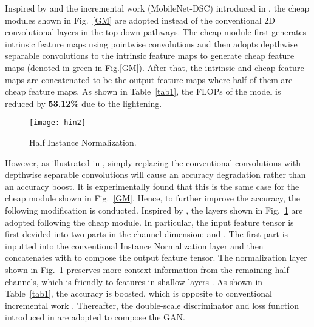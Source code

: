 \documentclass[letterpaper, 10 pt, conference]{ieeeconf}
\begin{document}
Inspired by \cite{ghostnet} and the incremental work (MobileNet-DSC) introduced in \cite{deblurgan2}, the cheap modules shown in Fig.~\ref{GM} are adopted instead of the conventional 2D convolutional layers in the top-down pathways. The cheap module first generates intrinsic feature maps using pointwise convolutions \cite{pw} and then adopts depthwise separable convolutions \cite{dw} to the intrinsic feature maps to generate cheap feature maps (denoted in green in Fig.\ref{GM}).  After that, the intrinsic and cheap feature maps are concatenated to be the output feature maps where half of them are cheap feature maps. As shown in Table~\ref{tab1}, the FLOPs of the model is reduced by \textbf{53.12\%} due to the lightening.
 \begin{figure}[thpb]
	\centering
	\texttt{[image: hin2]}
	\caption{Half Instance Normalization.}
	\label{hin}
\end{figure}

However, as illustrated in \cite{deblurgan2}, simply replacing the conventional convolutions with depthwise separable convolutions will cause an accuracy degradation rather than an accuracy boost. It is experimentally found that this is the same case for the cheap module shown in Fig.~\ref{GM}. Hence, to further improve the accuracy, the following modification is conducted. Inspired by \cite{chen2021hinet}, the layers shown in Fig.~\ref{hin} are adopted following the cheap module.  In particular, the input feature tensor  is first devided into two parts in the channel dimension:  and . The first part  is inputted into the conventional Instance Normalization layer \cite{in} and then concatenates with  to compose the output feature tensor.  The normalization layer shown in Fig.~\ref{hin} preserves more context information from the remaining half channels, which is friendly to features in shallow layers \cite{chen2021hinet}. As shown in Table~\ref{tab1}, the accuracy is boosted, which is opposite to conventional incremental work \cite{truong2020slimdeblurgan,chen2021hinet}. Thereafter, the double-scale discriminator and loss function introduced in \cite{deblurgan2} are adopted to compose the GAN. 
\end{document}
